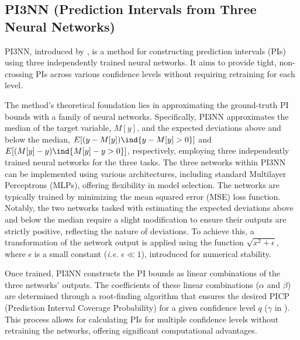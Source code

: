 \subsection{PI3NN (Prediction Intervals from Three Neural Networks)}
PI3NN, introduced by \textcite{pi3nn}, is a method for constructing prediction intervals (PIs) using three independently trained neural networks. It aims to provide tight, non-crossing PIs across various confidence levels without requiring retraining for each level.

The method's theoretical foundation lies in approximating the ground-truth PI bounds with a family of neural networks. Specifically, PI3NN approximates the median of the target variable, $M[y]$, and the expected deviations above and below the median, $E[(y - M[y]) \ind{y-M[y]>0}]$ and $E[(M[y] - y) \ind{M[y]-y>0}]$, respectively, employing three independently trained neural networks for the three tasks.
The three networks within PI3NN can be implemented using various architectures, including standard Multilayer Perceptrons (MLPs), offering flexibility in model selection. The networks are typically trained by minimizing the mean squared error (MSE) loss function. Notably, the two networks tasked with estimating the expected deviations above and below the median require a slight modification to ensure their outputs are strictly positive, reflecting the nature of deviations. To achieve this, a transformation of the network output is applied using the function $\sqrt{x^2 + \epsilon}$, where $\epsilon$ is a small constant (\emph{i.e.} $\epsilon \ll 1$), introduced for numerical stability.

Once trained, PI3NN constructs the PI bounds as linear combinations of the three networks' outputs. The coefficients of these linear combinations ($\alpha$ and $\beta$) are determined through a root-finding algorithm that ensures the desired PICP (Prediction Interval Coverage Probability) for a given confidence level $q$ ($\gamma$ in \cite{pi3nn}). This process allows for calculating PIs for multiple confidence levels without retraining the networks, offering significant computational advantages.

